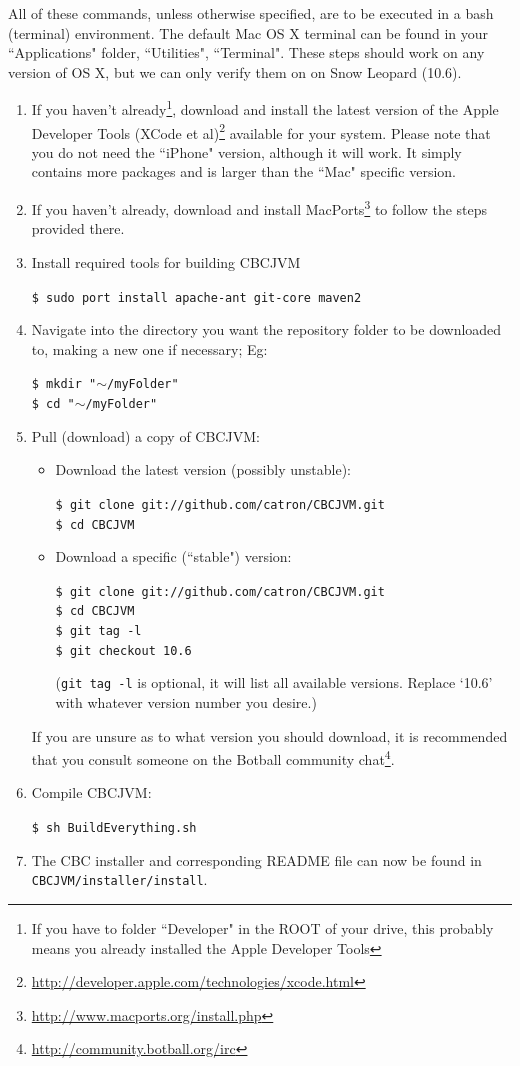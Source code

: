 \documentclass[12pt,letterpaper]{article}
\newcommand{\urlfootnote}[1]{\footnote{\url{#1}}}
\newcommand{\code}[1]{\par\texttt{#1}\par}
\begin{document}
All of these commands, unless otherwise specified, are to be executed in a bash (terminal) environment. The default Mac OS X terminal can be found in your ``Applications" folder, ``Utilities", ``Terminal". These steps should work on any version of OS X, but we can only verify them on on Snow Leopard (10.6).
\begin{enumerate}
\item If you haven't already\footnote{If you have to folder ``Developer" in the ROOT of your drive, this probably means you already installed the Apple Developer Tools}, download and install the latest version of the Apple Developer Tools (XCode et al)\urlfootnote{http://developer.apple.com/technologies/xcode.html} available for your system. Please note that you do not need the ``iPhone" version, although it will work. It simply contains more packages and is larger than the ``Mac" specific version.
\item If you haven't already, download and install MacPorts\urlfootnote{http://www.macports.org/install.php} to follow the steps provided there.
\item Install required tools for building CBCJVM
      \code{\$ sudo port install apache-ant git-core maven2}
\item Navigate into the directory you want the repository folder to be downloaded to, making a new one if necessary; Eg:
      \code{\$ mkdir "$\mathtt{\sim}$/myFolder"\\
            \$ cd "$\mathtt{\sim}$/myFolder"}
\item Pull (download) a copy of CBCJVM:\par
      \begin{itemize}
          \item Download the latest version (possibly unstable):
                \code{\$ git clone git://github.com/catron/CBCJVM.git \\
                      \$ cd CBCJVM}
          \item Download a specific (``stable") version:
                \code{\$ git clone git://github.com/catron/CBCJVM.git \\
                      \$ cd CBCJVM \\
                      \$ git tag -l \\
                      \$ git checkout 10.6}
                (\texttt{git tag -l} is optional, it will list all available versions. Replace `10.6' with whatever version number you desire.)
      \end{itemize}
      If you are unsure as to what version you should download, it is recommended that you consult someone on the Botball community chat\urlfootnote{http://community.botball.org/irc}.
\item Compile CBCJVM:
      \code{\$ sh BuildEverything.sh}
\item The CBC installer and corresponding README file can now be found in \texttt{CBCJVM/installer/install}.
\end{enumerate}
\end{document}
